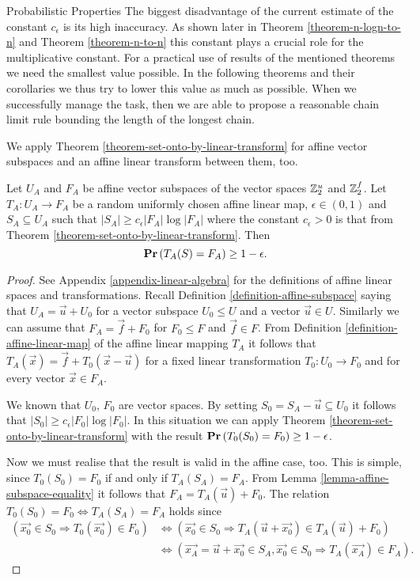 \begin{section}{Probabilistic Properties}
The biggest disadvantage of the current estimate of the constant $c_\epsilon$ is its high inaccuracy. As shown later in Theorem \ref{theorem-n-logn-to-n} and Theorem \ref{theorem-n-to-n} this constant plays a crucial role for the multiplicative constant. For a practical use of results of the mentioned theorems we need the smallest value possible. In the following theorems and their corollaries we thus try to lower this value as much as possible. When we successfully manage the task, then we are able to propose a reasonable chain limit rule bounding the length of the longest chain.
\end{section}

We apply Theorem \ref{theorem-set-onto-by-linear-transform} for affine vector subspaces and an affine linear transform between them, too.

\begin{corollary}
\label{corollary-affine-e2}
Let $U_A$ and $F_A$ be affine vector subspaces of the vector spaces $\mathbb{Z}_{2}^{u}$ and $\mathbb{Z}_{2}^{f}$. Let $T_A: U_A \rightarrow F_A$ be a random uniformly chosen affine linear map, $\epsilon \in (0, 1)$ and $S_A \subseteq U_A$ such that $|S_A| \geq c_\epsilon |F_A| \log |F_A|$ where the constant $c_{\epsilon} > 0$ is that from Theorem \ref{theorem-set-onto-by-linear-transform}. Then
\[
	\mathbf{Pr}\left(T_A(S) = F_A\right) \geq 1 - \epsilon \text{.}
\]
\end{corollary}
\begin{proof}
See Appendix \ref{appendix-linear-algebra} for the definitions of affine linear spaces and transformations. Recall Definition \ref{definition-affine-subspace} saying that $U_A = \vec{u} + U_0$ for a vector subspace $U_0 \leq U$ and a vector $\vec{u} \in U$. Similarly we can assume that $F_A = \vec{f} + F_0$ for $F_0 \leq F$ and $\vec{f} \in F$. From Definition \ref{definition-affine-linear-map} of the affine linear mapping $T_A$ it follows that $T_A(\vec{x}) = \vec{f} + T_0(\vec{x} - \vec{u})$ for a fixed linear transformation $T_0: U_0 \rightarrow F_0$ and for every vector $\vec{x} \in F_A$.

We known that $U_0$, $F_0$ are vector spaces. By setting $S_0 = S_A - \vec{u} \subseteq U_0$ it follows that $|S_0| \geq c_\epsilon |F_0| \log |F_0|$. In this situation we can apply Theorem \ref{theorem-set-onto-by-linear-transform} with the result $\mathbf{Pr}\left(T_0(S_0) = F_0\right) \geq 1 - \epsilon$.

Now we must realise that the result is valid in the affine case, too. This is simple, since $T_0(S_0) = F_0$ if and only if $T_A(S_A) = F_A$. From Lemma \ref{lemma-affine-subspace-equality} it follows that $F_A = T_A(\vec{u}) + F_0$. The relation $T_0(S_0) = F_0 \Leftrightarrow T_A(S_A) = F_A$ holds since
\[
\begin{split}
(\vec{x_0} \in S_0 \Rightarrow T_0(\vec{x_0}) \in F_0) 
	& \Leftrightarrow (\vec{x_0} \in S_0 \Rightarrow T_A(\vec{u} + \vec{x_0}) \in T_A(\vec{u}) + F_0) \\
	& \Leftrightarrow (\vec{x_A} = \vec{u} + \vec{x_0} \in S_A, \vec{x_0} \in S_0 \Rightarrow T_A(\vec{x_A}) \in F_A) \text{.}
\end{split}
\]
\end{proof}

